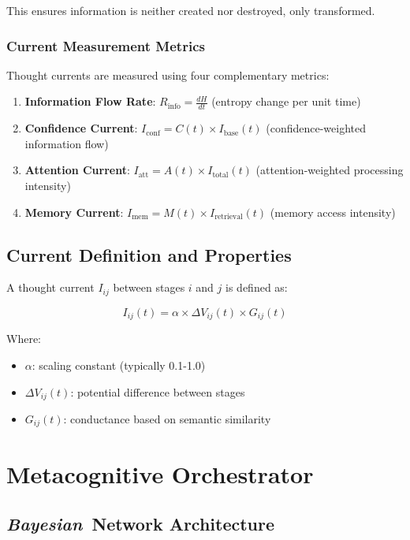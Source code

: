 \documentclass[11pt,a4paper]{article}
\newcommand{\bayesian}{\textit{Bayesian}}
\begin{document}
This ensures information is neither created nor destroyed, only transformed.

\subsubsection{Current Measurement Metrics}

Thought currents are measured using four complementary metrics:

\begin{enumerate}
\item \textbf{Information Flow Rate}: $R_{\text{info}} = \frac{dH}{dt}$ (entropy change per unit time)
\item \textbf{Confidence Current}: $I_{\text{conf}} = C(t) \times I_{\text{base}}(t)$ (confidence-weighted information flow)
\item \textbf{Attention Current}: $I_{\text{att}} = A(t) \times I_{\text{total}}(t)$ (attention-weighted processing intensity)
\item \textbf{Memory Current}: $I_{\text{mem}} = M(t) \times I_{\text{retrieval}}(t)$ (memory access intensity)
\end{enumerate}

\subsection{Current Definition and Properties}

A thought current $I_{ij}$ between stages $i$ and $j$ is defined as:

\begin{equation}
I_{ij}(t) = \alpha \times \Delta V_{ij}(t) \times G_{ij}(t)
\end{equation}

Where:
\begin{itemize}
\item $\alpha$: scaling constant (typically 0.1-1.0)
\item $\Delta V_{ij}(t)$: potential difference between stages
\item $G_{ij}(t)$: conductance based on semantic similarity
\end{itemize}

\section{Metacognitive Orchestrator}

\subsection{\bayesian\ Network Architecture}
\end{document}
